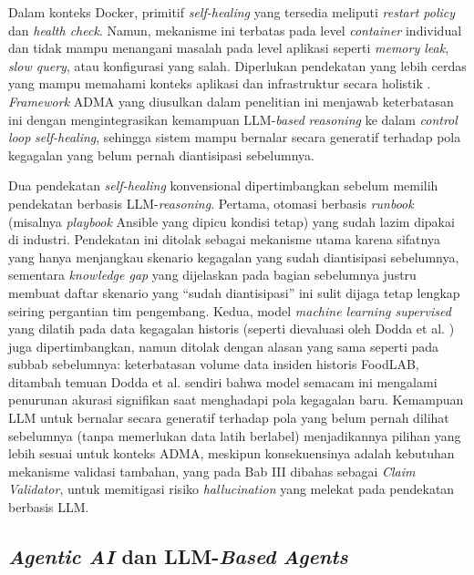 Dalam konteks Docker, primitif \textit{self-healing} yang tersedia meliputi \textit{restart policy} dan \textit{health check}. Namun, mekanisme ini terbatas pada level \textit{container} individual dan tidak mampu menangani masalah pada level aplikasi seperti \textit{memory leak}, \textit{slow query}, atau konfigurasi yang salah. Diperlukan pendekatan yang lebih cerdas yang mampu memahami konteks aplikasi dan infrastruktur secara holistik \cite{xu2025large}. \textit{Framework} ADMA yang diusulkan dalam penelitian ini menjawab keterbatasan ini dengan mengintegrasikan kemampuan LLM-\textit{based} \textit{reasoning} ke dalam \textit{control loop} \textit{self-healing}, sehingga sistem mampu bernalar secara generatif terhadap pola kegagalan yang belum pernah diantisipasi sebelumnya.

Dua pendekatan \textit{self-healing} konvensional dipertimbangkan sebelum memilih pendekatan berbasis LLM-\textit{reasoning}. Pertama, otomasi berbasis \textit{runbook} (misalnya \textit{playbook} Ansible yang dipicu kondisi tetap) yang sudah lazim dipakai di industri. Pendekatan ini ditolak sebagai mekanisme utama karena sifatnya yang hanya menjangkau skenario kegagalan yang sudah diantisipasi sebelumnya, sementara \textit{knowledge gap} yang dijelaskan pada bagian sebelumnya justru membuat daftar skenario yang ``sudah diantisipasi'' ini sulit dijaga tetap lengkap seiring pergantian tim pengembang. Kedua, model \textit{machine learning supervised} yang dilatih pada data kegagalan historis (seperti dievaluasi oleh Dodda et al. \cite{dodda2024enhancing}) juga dipertimbangkan, namun ditolak dengan alasan yang sama seperti pada subbab sebelumnya: keterbatasan volume data insiden historis FoodLAB, ditambah temuan Dodda et al. \cite{dodda2024enhancing} sendiri bahwa model semacam ini mengalami penurunan akurasi signifikan saat menghadapi pola kegagalan baru. Kemampuan LLM untuk bernalar secara generatif terhadap pola yang belum pernah dilihat sebelumnya (tanpa memerlukan data latih berlabel) menjadikannya pilihan yang lebih sesuai untuk konteks ADMA, meskipun konsekuensinya adalah kebutuhan mekanisme validasi tambahan, yang pada Bab III dibahas sebagai \textit{Claim Validator}, untuk memitigasi risiko \textit{hallucination} yang melekat pada pendekatan berbasis LLM.

\subsection{\textit{Agentic AI} dan LLM-\textit{Based} \textit{Agents}}

